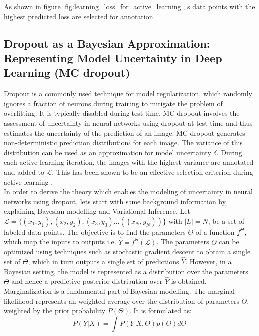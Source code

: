 As shown in figure \ref{fig:learning_loss_for_active_learning}, s data points with the highest predicted loss are selected for annotation.

\subsection{Dropout as a Bayesian Approximation: Representing Model Uncertainty in Deep Learning (MC dropout)}
Dropout\cite{srivastava2014} is a commonly used technique for model regularization, which randomly ignores a fraction of neurons during training to mitigate the problem of overfitting. It is typically disabled during test time. MC-dropout involves the assessment of uncertainty in neural networks using dropout at test time \cite{gal2016, gal2016phd} and thus estimates the uncertainty of the prediction of an image. MC-dropout generates non-deterministic prediction distributions for each image. The variance of this distribution can be used as an approximation for model uncertainty $\delta$. During each active learning iteration, the images with the highest variance are annotated and added to $\mathcal{L}$. This has been shown to be an effective selection criterion during active learning \cite{gal2016}. \\
In order to derive the theory which enables the modeling of uncertainty in neural networks using dropout, lets start with some background information by explaining Bayesian modelling and Variational Inference. Let $\mathcal{L} = \{(x_1, y_1), (x_2, y_2), (x_3, y_3) ... ((x_N, y_N))\}$ with $|L| = N$, be a set of labeled data points. The objective is to find the parameters $\Theta$ of a function $f^\Theta$, which map the inputs to outputs i.e. $\hat{Y} = f^\Theta(\mathcal{L})$. The parameters $\Theta$ can be optimized using techniques such as stochastic gradient descent to obtain a single set of $\Theta$, which in turn outputs a single set of predictions $\hat{Y}$. However, in a Bayesian setting, the model is represented as a distribution over the parameters $\Theta$ and hence a predictive posterior distribution over $\hat{Y}$ is obtained. Marginalization is a fundamental part of Bayesian modelling. The marginal likelihood represents an weighted average over the distribution of parameters $\Theta$, weighted by the prior probability $P(\Theta)$. It is formulated as:
\begin{equation}
    \label{equation:marginal_likelihood_mc_dropout}
    P(Y | X) = \int P(Y | X, \Theta) p(\Theta) d\Theta
\end{equation}

